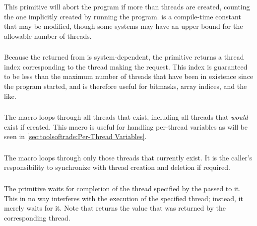 This primitive will abort the program if more than 
threads are created, counting the one implicitly created by running
the program.
 is a compile-time constant that may be modified,
though some systems may have an upper bound for the allowable number
of threads.

\subsubsection{}

Because the  returned from  is
system-dependent, the  primitive returns a thread
index corresponding to the thread making the request.
This index is guaranteed to be less than the maximum number of threads
that have been in existence since the program started,
and is therefore useful for bitmasks, array indices, and
the like.

\subsubsection{}

The  macro loops through all threads that exist,
including all threads that \emph{would} exist if created.
This macro is useful for handling per-thread variables as will be
seen in \cref{sec:toolsoftrade:Per-Thread Variables}.

\subsubsection{}

The 
macro loops through only those threads that currently exist.
It is the caller's responsibility to synchronize with thread
creation and deletion if required.

\subsubsection{}

The  primitive waits for completion of the thread
specified by the  passed to it.
This in no way interferes with the execution of the specified thread;
instead, it merely waits for it.
Note that  returns the value that was returned by
the corresponding thread.

